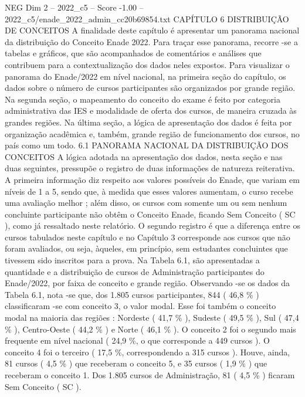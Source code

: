 \begin{textsample}{NEG Dim 2 – 2022\_c5 – Score -1.00 – 2022\_c5/enade\_2022\_admin\_cc20b69854.txt}  \label{ex:f2_neg_212}
CAPÍTULO 6 DISTRIBUIÇÃO DE CONCEITOS A finalidade deste capítulo é apresentar um panorama nacional da distribuição do Conceito Enade 2022.
Para traçar esse panorama, recorre -se a tabelas e gráficos, que são acompanhados de comentários e análises que contribuem para a contextualização dos dados neles expostos.
Para visualizar o panorama do Enade/2022 em nível nacional, na primeira seção do capítulo, os dados sobre o número de cursos participantes são organizados por grande região.
Na segunda seção, o mapeamento do conceito do exame é feito por categoria administrativa das IES e modalidade de oferta dos cursos, de maneira cruzada às grandes regiões.
Na última seção, a lógica de apresentação dos dados é feita por organização acadêmica e, também, grande região de funcionamento dos cursos, no país como um todo. 6.1 PANORAMA NACIONAL DA DISTRIBUIÇÃO DOS CONCEITOS A lógica adotada na apresentação dos dados, nesta seção e nas duas seguintes, pressupõe o registro de duas informações de natureza reiterativa.
A primeira informação diz respeito aos valores possíveis do Enade, que variam em níveis de 1 a 5, sendo que, à medida que esses valores aumentam, o curso recebe uma avaliação melhor ; além disso, os cursos com somente um ou sem nenhum concluinte participante não obtêm o Conceito Enade, ficando Sem Conceito ( SC ), como já ressaltado neste relatório.
O segundo registro é que a diferença entre os cursos tabulados neste capítulo e no Capítulo 3 corresponde aos cursos que não foram avaliados, ou seja, àqueles, em princípio, sem estudantes concluintes que tivessem sido inscritos para a prova.
Na Tabela 6.1, são apresentadas a quantidade e a distribuição de cursos de Administração participantes do Enade/2022, por faixa de conceito e grande região.
Observando -se os dados da Tabela 6.1, nota -se que, dos 1.805 cursos participantes, 844 ( 46,8 \% ) classificaram -se com conceito 3, o valor modal.
Esse foi também o conceito modal na maioria das regiões : Nordeste ( 41,7 \% ), Sudeste ( 49,5 \% ), Sul ( 47,4 \% ), Centro-Oeste ( 44,2 \% ) e Norte ( 46,1 \% ).
O conceito 2 foi o segundo mais frequente em nível nacional ( 24,9 \%, o que corresponde a 449 cursos ).
O conceito 4 foi o terceiro ( 17,5 \%, correspondendo a 315 cursos ).
Houve, ainda, 81 cursos ( 4,5 \% ) que receberam o conceito 5, e 35 cursos ( 1,9 \% ) que receberam o conceito 1.
Dos 1.805 cursos de Administração, 81 ( 4,5 \% ) ficaram Sem Conceito ( SC ).

\end{textsample}
